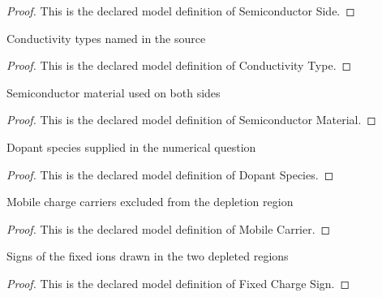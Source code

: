 \begin{proof}
  This is the declared model definition of Semiconductor Side.
\end{proof}
\begin{definition}
  \label{def:physics:phyx-mini-0630:phyxminiproblems-problemphyxmini0630-conductivitytype}
  Conductivity types named in the source
\end{definition}
\begin{proof}
  This is the declared model definition of Conductivity Type.
\end{proof}
\begin{definition}
  \label{def:physics:phyx-mini-0630:phyxminiproblems-problemphyxmini0630-semiconductormaterial}
  Semiconductor material used on both sides
\end{definition}
\begin{proof}
  This is the declared model definition of Semiconductor Material.
\end{proof}
\begin{definition}
  \label{def:physics:phyx-mini-0630:phyxminiproblems-problemphyxmini0630-dopantspecies}
  Dopant species supplied in the numerical question
\end{definition}
\begin{proof}
  This is the declared model definition of Dopant Species.
\end{proof}
\begin{definition}
  \label{def:physics:phyx-mini-0630:phyxminiproblems-problemphyxmini0630-mobilecarrier}
  Mobile charge carriers excluded from the depletion region
\end{definition}
\begin{proof}
  This is the declared model definition of Mobile Carrier.
\end{proof}
\begin{definition}
  \label{def:physics:phyx-mini-0630:phyxminiproblems-problemphyxmini0630-fixedchargesign}
  Signs of the fixed ions drawn in the two depleted regions
\end{definition}
\begin{proof}
  This is the declared model definition of Fixed Charge Sign.
\end{proof}
